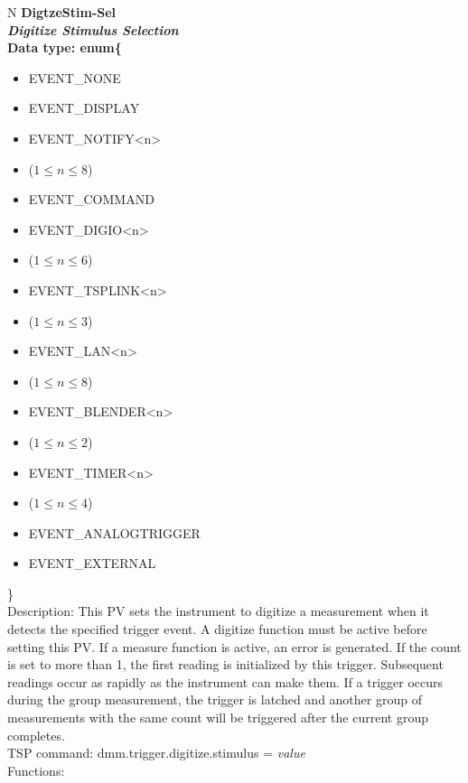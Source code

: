 \documentclass[openany]{article}
\begin{document}
		\begin{tabular}{N}
			\hline
			\bfseries DigtzeStim-Sel\label{pv:digtzestim-sel} \\ \hline
			\emph{Digitize Stimulus Selection} \\
			Data type: enum\{\begin{itemize}[noitemsep]
				\small
				\item[] EVENT\_NONE
				\item[] EVENT\_DISPLAY
				\item[] EVENT\_NOTIFY\textless n\textgreater
				\item[] ($1\leq n\leq 8$)
				\item[] EVENT\_COMMAND
				\item[] EVENT\_DIGIO\textless n\textgreater
				\item[] ($1\leq n\leq 6$)
				\item[] EVENT\_TSPLINK\textless n\textgreater
				\item[] ($1\leq n\leq 3$)
				\item[] EVENT\_LAN\textless n\textgreater
				\item[] ($1\leq n\leq 8$)
				\item[] EVENT\_BLENDER\textless n\textgreater 
				\item[] ($1\leq n\leq 2$)
				\item[] EVENT\_TIMER\textless n\textgreater
				\item[] ($1\leq n\leq 4$)
				\item[] EVENT\_ANALOGTRIGGER
				\item[] EVENT\_EXTERNAL
			\end{itemize}\} \\
			Description: This PV sets the instrument to digitize a measurement when it detects the specified trigger event. A digitize function must be active before setting this PV. If a measure function is active, an error is generated. If the count is set to more than 1, the first reading is initialized by this trigger. Subsequent readings occur as rapidly as the instrument can make them. If a trigger occurs during the group measurement, the trigger is latched and another group of measurements with the same count will be triggered after the current group completes. \\
			TSP command: dmm.trigger.digitize.stimulus = \emph{value} \\
			Functions: \\
			\arrayrulecolor{\FuncTableBorderColor}

		\end{tabular}
\end{document}
